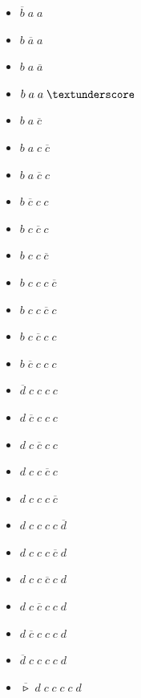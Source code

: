 \documentclass[a4paper,10pt,oneside]{book}
\begin{document}
\begin{itemize}
    \item $\overline b \; a \; a$
    \item $b \; \overline a \; a$
    \item $b \; a \; \overline a$
    \item $b \; a \; a \; \textunderscore$
    \item $b \; a \; \overline c$
    \item $b \; a \; c \; \overline c$
    \item $b \; a \; \overline c \; c$
    \item $b \; \overline c \; c \; c$
    \item $b \; c \; \overline c \; c$
    \item $b \; c \; c \; \overline c$
    \item $b \; c \; c \; c \; \overline c$
    \item $b \; c \; c \; \overline c \; c$
    \item $b \; c \; \overline c \; c \; c$
    \item $b \; \overline c \; c \; c \; c$
    \item $\overline d \; c \; c \; c \; c$
    \item $d \; \overline c \; c \; c \; c$
    \item $d \; c \; \overline c \; c \; c$
    \item $d \; c \; c \; \overline c \; c$
    \item $d \; c \; c \; c \; \overline c$
    \item $d \; c \; c \; c \; c \; \overline d$
    \item $d \; c \; c \; c \; \overline c \; d$
    \item $d \; c \; c \; \overline c \; c \; d$
    \item $d \; c \; \overline c \; c \; c \; d$
    \item $d \; \overline c \; c \; c \; c \; d$
    \item $\overline d \; c \; c \; c \; c \; d$
    \item $\overline \smalltriangleright \; d \; c \; c \; c \; c \; d$
    
\end{itemize}
\end{document}
